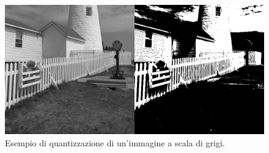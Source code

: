 \documentclass{subfiles}
\begin{document}
\begin{figure}[!h]
    \centering
    \includegraphics[scale = 0.325]{../Images/Lighthouse/LighthouseComparison.png}
    \caption{Esempio di quantizzazione di un'immagine a scala di grigi.}
    \label{fig:5.1}
\end{figure}
\end{document}
